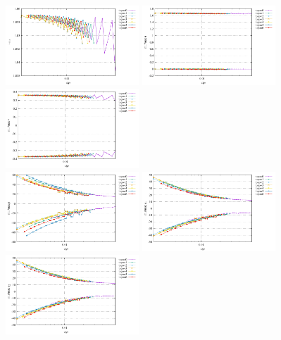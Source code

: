 \begin{center}
\includegraphics[width=5cm]{python_codes/fieldstone_78/results/vrms_exp12.pdf} 
\includegraphics[width=5cm]{python_codes/fieldstone_78/results/stats_u_exp12.pdf}
\includegraphics[width=5cm]{python_codes/fieldstone_78/results/stats_v_exp12.pdf}\\
\includegraphics[width=5cm]{python_codes/fieldstone_78/results/stats_p_exp12.pdf}
\includegraphics[width=5cm]{python_codes/fieldstone_78/results/stats_q1_exp12.pdf}
\includegraphics[width=5cm]{python_codes/fieldstone_78/results/stats_q2_exp12.pdf}
\end{center}







